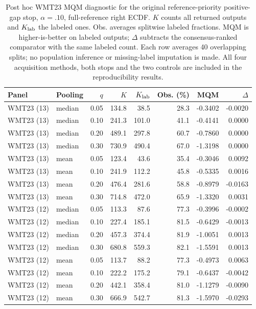 \begin{table}[t]
\centering\small
\begin{tabular}{llrrrrrr}
\toprule
Panel & Pooling & $q$ & $K$ & $K_{\rm lab}$ & Obs. (\%) & MQM & $\Delta$ \\
\midrule
WMT23 (13) & median & 0.05 & 134.8 & 38.5 & 28.3 & -0.3402 & -0.0020 \\
WMT23 (13) & median & 0.10 & 241.3 & 101.0 & 41.1 & -0.4141 & 0.0000 \\
WMT23 (13) & median & 0.20 & 489.1 & 297.8 & 60.7 & -0.7860 & 0.0000 \\
WMT23 (13) & median & 0.30 & 730.9 & 490.4 & 67.0 & -1.3198 & 0.0000 \\
WMT23 (13) & mean & 0.05 & 123.4 & 43.6 & 35.4 & -0.3046 & 0.0092 \\
WMT23 (13) & mean & 0.10 & 241.9 & 112.2 & 45.8 & -0.5335 & 0.0016 \\
WMT23 (13) & mean & 0.20 & 476.4 & 281.6 & 58.8 & -0.8979 & -0.0163 \\
WMT23 (13) & mean & 0.30 & 714.8 & 472.0 & 65.9 & -1.3320 & 0.0031 \\
WMT23 (12) & median & 0.05 & 113.3 & 87.6 & 77.3 & -0.3996 & -0.0002 \\
WMT23 (12) & median & 0.10 & 227.4 & 185.1 & 81.5 & -0.6429 & -0.0013 \\
WMT23 (12) & median & 0.20 & 457.3 & 374.4 & 81.9 & -1.0051 & 0.0013 \\
WMT23 (12) & median & 0.30 & 680.8 & 559.3 & 82.1 & -1.5591 & 0.0013 \\
WMT23 (12) & mean & 0.05 & 113.7 & 88.2 & 77.3 & -0.4973 & 0.0063 \\
WMT23 (12) & mean & 0.10 & 222.2 & 175.2 & 79.1 & -0.6437 & -0.0042 \\
WMT23 (12) & mean & 0.20 & 442.1 & 358.4 & 81.0 & -1.1279 & -0.0090 \\
WMT23 (12) & mean & 0.30 & 666.9 & 542.7 & 81.3 & -1.5970 & -0.0293 \\
\bottomrule
\end{tabular}
\caption{Post hoc WMT23 MQM diagnostic for the original reference-priority positive-gap stop, $\alpha=.10$, full-reference right ECDF. $K$ counts all returned outputs and $K_{\rm lab}$ the labeled ones. Obs. averages splitwise labeled fractions. MQM is higher-is-better on labeled outputs; $\Delta$ subtracts the consensus-ranked comparator with the same labeled count. Each row averages 40 overlapping splits; no population inference or missing-label imputation is made. All four acquisition methods, both stops and the two controls are included in the reproducibility results.}
\label{tab:wmt23-native-quality}
\end{table}
